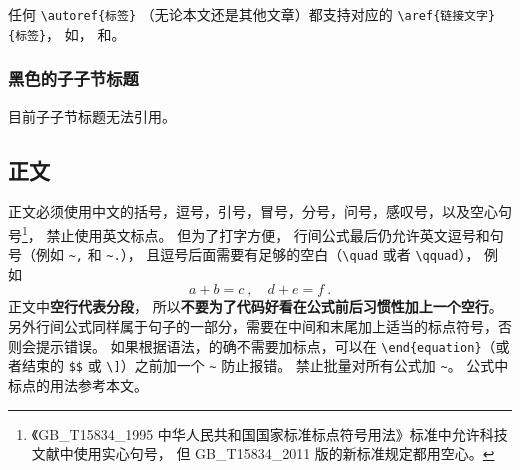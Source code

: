 任何 \verb`\autoref{标签}` （无论本文还是其他文章）都支持对应的 \verb`\aref{链接文字}{标签}`， 如， 和。

\subsubsection{黑色的子子节标题}
目前子子节标题无法引用。

\subsection{正文}\label{sub_Sample_16}
正文必须使用中文的括号，逗号，引号，冒号，分号，问号，感叹号，以及空心句号\footnote{《GB\_T15834\_1995 中华人民共和国国家标准标点符号用法》标准中允许科技文献中使用实心句号， 但 GB\_T15834\_2011 版的新标准规定都用空心。}， 禁止使用英文标点。 但为了打字方便， 行间公式最后仍允许英文逗号和句号（例如 \verb`~,` 和 \verb`~.`）， 且逗号后面需要有足够的空白（\verb`\quad` 或者 \verb`\qquad`）， 例如
\begin{equation}\label{eq_Sample_2}
a + b = c~, \quad d + e = f~.
\end{equation}
正文中\textbf{空行代表分段}， 所以\textbf{不要为了代码好看在公式前后习惯性加上一个空行}。 另外行间公式同样属于句子的一部分，需要在中间和末尾加上适当的标点符号，否则会提示错误。 如果根据语法，的确不需要加标点，可以在 \verb`\end{equation}`（或者结束的 \verb`$$` 或 \verb`\]`）之前加一个 \verb`~` 防止报错。 禁止批量对所有公式加 \verb`~`。 公式中标点的用法参考本文。

